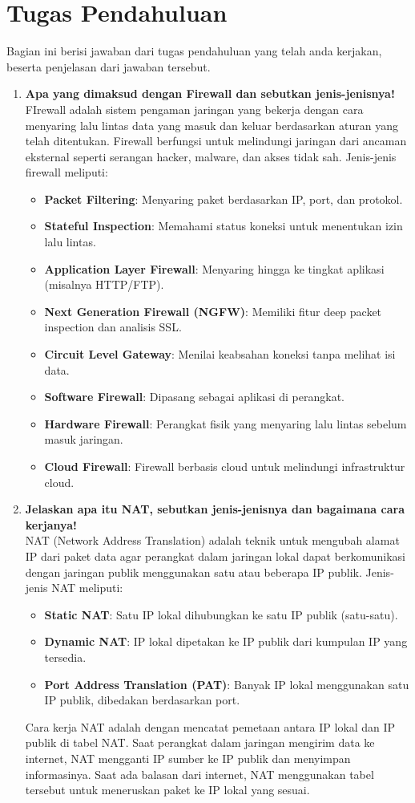 \section{Tugas Pendahuluan}
Bagian ini berisi jawaban dari tugas pendahuluan yang telah anda kerjakan, beserta penjelasan dari jawaban tersebut.
\begin{enumerate}
	\item \textbf{Apa yang dimaksud dengan Firewall dan sebutkan jenis-jenisnya!} \\
	FIrewall adalah sistem pengaman jaringan yang bekerja dengan cara menyaring lalu lintas data yang masuk dan keluar berdasarkan aturan yang telah ditentukan. Firewall berfungsi untuk melindungi jaringan dari ancaman eksternal seperti serangan hacker, malware, dan akses tidak sah. Jenis-jenis firewall meliputi:
	\begin{itemize}
		\item \textbf{Packet Filtering}: Menyaring paket berdasarkan IP, port, dan protokol.
		\item \textbf{Stateful Inspection}: Memahami status koneksi untuk menentukan izin lalu lintas.
		\item \textbf{Application Layer Firewall}: Menyaring hingga ke tingkat aplikasi (misalnya HTTP/FTP).
		\item \textbf{Next Generation Firewall (NGFW)}: Memiliki fitur deep packet inspection dan analisis SSL.
		\item \textbf{Circuit Level Gateway}: Menilai keabsahan koneksi tanpa melihat isi data.
		\item \textbf{Software Firewall}: Dipasang sebagai aplikasi di perangkat.
		\item \textbf{Hardware Firewall}: Perangkat fisik yang menyaring lalu lintas sebelum masuk jaringan.
		\item \textbf{Cloud Firewall}: Firewall berbasis cloud untuk melindungi infrastruktur cloud.
	\end{itemize}
	
	\item \textbf{Jelaskan apa itu NAT, sebutkan jenis-jenisnya dan bagaimana cara kerjanya!} \\
	NAT (Network Address Translation) adalah teknik untuk mengubah alamat IP dari paket data agar perangkat dalam jaringan lokal dapat berkomunikasi dengan jaringan publik menggunakan satu atau beberapa IP publik. Jenis-jenis NAT meliputi:
	\begin{itemize}
		\item \textbf{Static NAT}: Satu IP lokal dihubungkan ke satu IP publik (satu-satu).
		\item \textbf{Dynamic NAT}: IP lokal dipetakan ke IP publik dari kumpulan IP yang tersedia.
		\item \textbf{Port Address Translation (PAT)}: Banyak IP lokal menggunakan satu IP publik, dibedakan berdasarkan port.
	\end{itemize}
	Cara kerja NAT adalah dengan mencatat pemetaan antara IP lokal dan IP publik di tabel NAT. Saat perangkat dalam jaringan mengirim data ke internet, NAT mengganti IP sumber ke IP publik dan menyimpan informasinya. Saat ada balasan dari internet, NAT menggunakan tabel tersebut untuk meneruskan paket ke IP lokal yang sesuai.
	

\end{enumerate}
